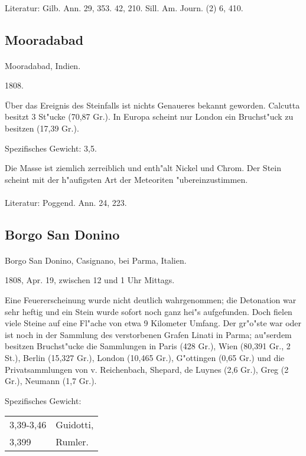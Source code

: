 \documentclass[a4paper, 11pt, oneside]{article}
\begin{document}
\paragraph{}
Literatur: Gilb. Ann. 29, 353. 42, 210. Sill. Am. Journ. (2) 6, 410.
\subsection{Mooradabad}
\normalsize
\paragraph{}
Mooradabad, Indien.

1808.

Über das Ereignis des Steinfalls ist nichts Genaueres bekannt geworden. Calcutta besitzt 3 St"ucke (70,87 Gr.). In Europa scheint nur London ein Bruchst"uck zu besitzen (17,39 Gr.).

Spezifisches Gewicht: 3,5.

Die Masse ist ziemlich zerreiblich und enth"alt Nickel und Chrom. Der Stein scheint mit der h"aufigsten Art der Meteoriten "ubereinzustimmen.
\footnotesize
\paragraph{}
Literatur: Poggend. Ann. 24, 223.
\subsection{Borgo San Donino}
\normalsize
\paragraph{}
Borgo San Donino, Casignano, bei Parma, Italien.

1808, Apr. 19, zwischen 12 und 1 Uhr Mittags.

Eine Feuererscheinung wurde nicht deutlich wahrgenommen; die Detonation war sehr heftig und ein Stein wurde sofort noch ganz hei"s aufgefunden. Doch fielen viele Steine auf eine Fl"ache von etwa 9 Kilometer Umfang. Der gr"o"ste war oder ist noch in der Sammlung des verstorbenen Grafen Linati in Parma; au"serdem besitzen Bruchst"ucke die Sammlungen in Paris (428 Gr.), Wien (80,391 Gr., 2 St.), Berlin (15,327 Gr.), London (10,465 Gr.), G"ottingen (0,65 Gr.) und die Privatsammlungen von v. Reichenbach, Shepard, de Luynes (2,6 Gr.), Greg (2 Gr.), Neumann (1,7 Gr.).

Spezifisches Gewicht:
\begin{table}[!ht]
    \centering
    \begin{tabular}{l l}
        3,39-3,46 & Guidotti,\\
        3,399 & Rumler.
    \end{tabular}
\end{table}
\end{document}
